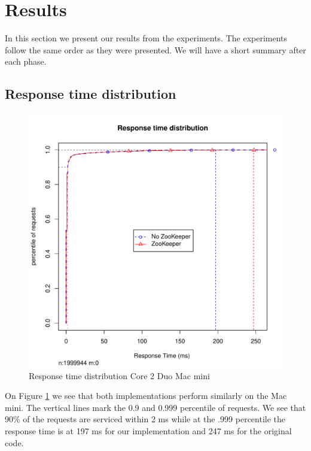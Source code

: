 \section{Results}
In this section we present our results from the experiments. The experiments follow the same order as they were presented. We will have a short summary after each phase. 


\subsection{Response time distribution}

\clearpage
\begin{figure}[h]
    \centering
    \includegraphics[width=1.0\textwidth]{results/distribution/distribution_macmini}
    \caption{Response time distribution Core 2 Duo Mac mini}
    \label{fig:dist_mini}
\end{figure}

On Figure \ref{fig:dist_mini} we see that both implementations perform similarly on the Mac mini. The vertical lines mark the 0.9 and 0.999 percentile of requests. We see that 90\% of the requests are serviced within 2 ms while at the .999 percentile the response time is at 197 ms for our implementation and 247 ms for the original code.  

